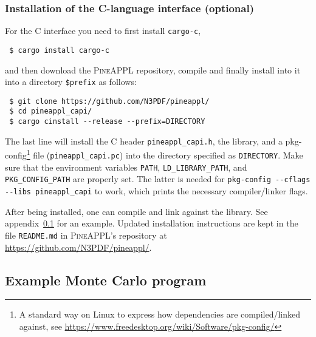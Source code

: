 \subsubsection*{Installation of the C-language interface (optional)}

For the C interface you need to first install \texttt{cargo-c},
\begin{verbatim}
 $ cargo install cargo-c
\end{verbatim}
and then download the \textsc{PineAPPL} repository, compile and finally install into it into a directory \texttt{\$prefix} as follows:
\begin{verbatim}
 $ git clone https://github.com/N3PDF/pineappl/
 $ cd pineappl_capi/
 $ cargo cinstall --release --prefix=DIRECTORY
\end{verbatim}
The last line will install the C header \texttt{pineappl\_capi.h}, the library, and a pkg-config\footnote{A standard way on Linux to express how dependencies are compiled/linked against, see \url{https://www.freedesktop.org/wiki/Software/pkg-config/}} file (\texttt{pineappl\_capi.pc}) into the directory specified as \texttt{DIRECTORY}.
Make sure that the environment variables \texttt{PATH}, \texttt{LD\_LIBRARY\_PATH}, and \texttt{PKG\_CONFIG\_PATH} are properly set.
The latter is needed for \texttt{pkg-config -{}-cflags -{}-libs pineappl\_capi} to work, which prints the necessary compiler/linker flags.

After being installed, one can compile and link against the library.
See appendix~\ref{app:example-program} for an example.
Updated installation instructions are kept in the file \texttt{README.md} in \textsc{PineAPPL}'s repository at \url{https://github.com/N3PDF/pineappl/}.

\subsection{Example Monte Carlo program}
\label{app:example-program}




